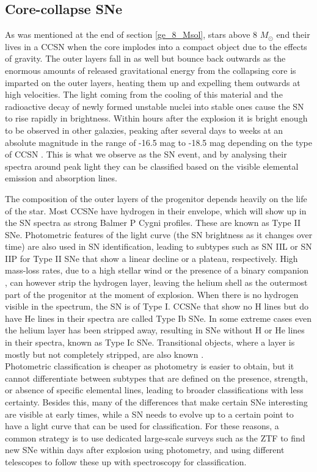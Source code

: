 \documentclass[a4paper,oneside,12pt, class=Latex/Classes/PhDthesisPSnPDF, crop=false]{standalone}
\begin{document}
\subsection{Core-collapse SNe}
\label{CCSN}
As was mentioned at the end of section \ref{ge_8_Msol}, stars above 8 $M_\odot$ end their lives in a CCSN when the core implodes into a compact object due to the effects of gravity. The outer layers fall in as well but bounce back outwards as the enormous amounts of released gravitational energy from the collapsing core is imparted on the outer layers, heating them up and expelling them outwards at high velocities. The light coming from the cooling of this material and the radioactive decay of newly formed unstable nuclei into stable ones cause the SN to rise rapidly in brightness. Within hours after the explosion it is bright enough to be observed in other galaxies, peaking after several days to weeks at an absolute magnitude in the range of -16.5 mag to -18.5 mag depending on the type of CCSN \citep{SN_M_dist}. This is what we observe as the SN event, and by analysing their spectra around peak light they can be classified based on the visible elemental emission and absorption lines.

The composition of the outer layers of the progenitor depends heavily on the life of the star. Most CCSNe have hydrogen in their envelope, which will show up in the SN spectra as strong Balmer P Cygni profiles. These are known as Type II SNe. Photometric features of the light curve (the SN brightness as it changes over time) are also used in SN identification, leading to subtypes such as SN IIL or SN IIP for Type II SNe that show a linear decline or a plateau, respectively. High mass-loss rates, due to a high stellar wind \citep{He-star_pre_SN_evol_mass_loss} or the presence of a binary companion \citep{He-star_pre_SN_evol_binaries}, can however strip the hydrogen layer, leaving the helium shell as the outermost part of the progenitor at the moment of explosion. When there is no hydrogen visible in the spectrum, the SN is of Type I. CCSNe that show no H lines but do have He lines in their spectra are called Type Ib SNe. In some extreme cases even the helium layer has been stripped away, resulting in SNe without H or He lines in their spectra, known as Type Ic SNe. Transitional objects, where a layer is mostly but not completely stripped, are also known \citep{SN_large_pic}.\\

Photometric classification is cheaper as photometry is easier to obtain, but it cannot differentiate between subtypes that are defined on the presence, strength, or absence of specific elemental lines, leading to broader classifications with less certainty. Besides this, many of the differences that make certain SNe interesting are visible at early times, while a SN needs to evolve up to a certain point to have a light curve that can be used for classification. For these reasons, a common strategy is to use dedicated large-scale surveys such as the ZTF to find new SNe within days after explosion using photometry, and using different telescopes to follow these up with spectroscopy for classification.
\end{document}
